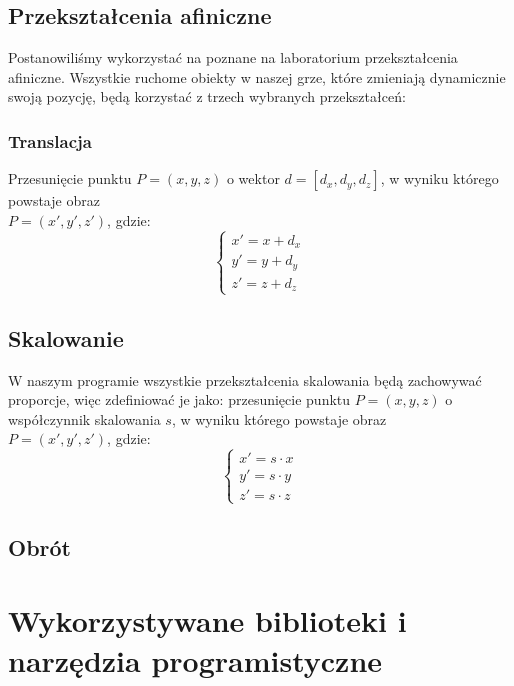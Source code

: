 \documentclass[a4paper,twoside]{article}
\begin{document}
		\subsection{Przekształcenia afiniczne}
			Postanowiliśmy wykorzystać na poznane na laboratorium przekształcenia afiniczne. Wszystkie ruchome obiekty w naszej grze, które zmieniają dynamicznie swoją pozycję, będą korzystać z trzech wybranych przekształceń:
			\subsubsection{Translacja}
				Przesunięcie punktu $ P=(x, y, z) $ o wektor $ d=[d_x, d_y, d_z] $, w wyniku którego powstaje obraz\\ $ P=(x', y', z') $, gdzie:
				$$
					\begin{cases}
						x'=x+d_x\\
						y'=y+d_y\\
						z'=z+d_z
					\end{cases}
				$$
			\subsection{Skalowanie}
				W naszym programie wszystkie przekształcenia skalowania będą zachowywać proporcje, więc zdefiniować je jako: przesunięcie punktu $ P=(x, y, z) $ o współczynnik skalowania $ s $, w wyniku którego powstaje obraz\\ $ P=(x', y', z') $, gdzie:
				$$
					\begin{cases}
						x'=s\cdot x\\
						y'=s\cdot y\\
						z'=s\cdot z
					\end{cases}
				$$
			\subsection{Obrót}
				
	
	\section{Wykorzystywane biblioteki i narzędzia programistyczne}
\end{document}

